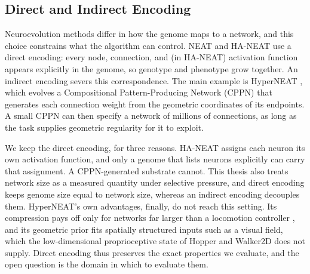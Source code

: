 \documentclass[12pt]{article}
\begin{document}
\subsection{Direct and Indirect Encoding}
\label{subsec:direct-and-indirect-encoding}


Neuroevolution methods differ in how the genome maps to a network, and this choice constrains what the algorithm can control.
NEAT and HA-NEAT use a direct encoding: every node, connection, and (in HA-NEAT) activation function appears explicitly in the genome, so genotype and phenotype grow together.
An indirect encoding severs this correspondence.
The main example is HyperNEAT \parencite{stanley_hypercubebased_2009}, which evolves a Compositional Pattern-Producing Network (CPPN) \parencite{stanley_compositional_2007} that generates each connection weight from the geometric coordinates of its endpoints.
A small CPPN can then specify a network of millions of connections, as long as the task supplies geometric regularity for it to exploit.

We keep the direct encoding, for three reasons.
HA-NEAT assigns each neuron its own activation function, and only a genome that lists neurons explicitly can carry that assignment. A CPPN-generated substrate cannot.
This thesis also treats network size as a measured quantity under selective pressure, and direct encoding keeps genome size equal to network size, whereas an indirect encoding decouples them.
HyperNEAT's own advantages, finally, do not reach this setting.
Its compression pays off only for networks far larger than a locomotion controller \parencite{stanley_hypercubebased_2009}, and its geometric prior fits spatially structured inputs such as a visual field, which the low-dimensional proprioceptive state of Hopper and Walker2D does not supply.
Direct encoding thus preserves the exact properties we evaluate, and the open question is the domain in which to evaluate them.
\end{document}
